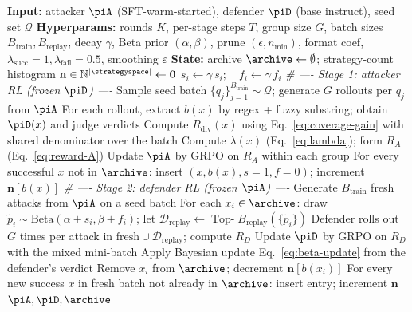\begin{algorithm}[h]
  \caption{\method training loop (full)}
  \label{alg:dace-full}
  \begin{algorithmic}[1]
    \State \textbf{Input:} attacker $\piA$ (SFT-warm-started), defender $\piD$ (base instruct), seed set $\mathcal{Q}$
    \State \textbf{Hyperparams:} rounds $K$, per-stage steps $T$, group size $G$, batch sizes $B_{\mathrm{train}}, B_{\mathrm{replay}}$, decay $\gamma$, Beta prior $(\alpha,\beta)$, prune $(\epsilon, n_{\min})$, format coef, $\lambda_{\mathrm{succ}}=1, \lambda_{\mathrm{fail}}=0.5$, smoothing $\varepsilon$
    \State \textbf{State:} archive $\archive\leftarrow\emptyset$; strategy-count histogram $\mathbf{n}\in\mathbb{N}^{|\strategyspace|}\leftarrow\mathbf{0}$
       
        \State $s_i \leftarrow \gamma\,s_i;\quad f_i \leftarrow \gamma\,f_i$
      \EndFor
      \Statex \hspace*{-1.1em}\textit{\small \# ---- Stage 1: attacker RL (frozen $\piD$) ----}
        \State Sample seed batch $\{q_j\}_{j=1}^{B_{\mathrm{train}}}\sim\mathcal{Q}$; generate $G$ rollouts per $q_j$ from $\piA$
        \State For each rollout, extract $b(x)$ by regex + fuzzy substring; obtain $\piD(x)$ and judge verdicts
        \State Compute $R_{\mathrm{div}}(x)$ using Eq.~\ref{eq:coverage-gain} with shared denominator over the batch
        \State Compute $\lambda(x)$ (Eq.~\ref{eq:lambda}); form $R_A$ (Eq.~\ref{eq:reward-A})
        \State Update $\piA$ by GRPO on $R_A$ within each group
        \State For every successful $x$ not in $\archive$: insert $(x, b(x), s\!=\!1, f\!=\!0)$; increment $\mathbf{n}[b(x)]$
      \EndFor
      \Statex \hspace*{-1.1em}\textit{\small \# ---- Stage 2: defender RL (frozen $\piA$) ----}
        \State Generate $B_{\mathrm{train}}$ fresh attacks from $\piA$ on a seed batch
        \State For each $x_i\in\archive$: draw $\tilde p_i\sim\mathrm{Beta}(\alpha+s_i,\beta+f_i)$; let $\mathcal{D}_{\mathrm{replay}}\leftarrow\operatorname{Top-}B_{\mathrm{replay}}(\{\tilde p_i\})$
        \State Defender rolls out $G$ times per attack in $\mathrm{fresh}\cup\mathcal{D}_{\mathrm{replay}}$; compute $R_D$
        \State Update $\piD$ by GRPO on $R_D$ with the mixed mini-batch
          \State Apply Bayesian update Eq.~\ref{eq:beta-update} from the defender's verdict
            \State Remove $x_i$ from $\archive$; decrement $\mathbf{n}[b(x_i)]$
          \EndIf
        \EndFor
        \State For every new success $x$ in fresh batch not already in $\archive$: insert entry; increment $\mathbf{n}$
      \EndFor
    \EndFor
    \State \Return $\piA,\piD,\archive$
  \end{algorithmic}
\end{algorithm}

